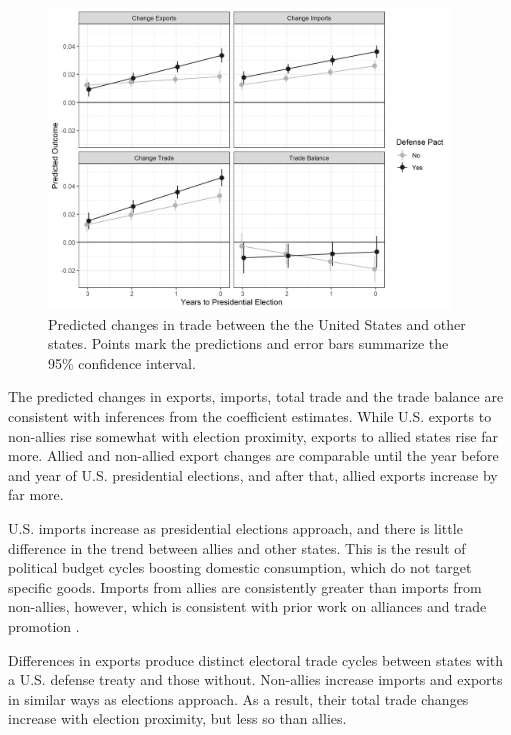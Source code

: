 \documentclass[12pt]{article}
\begin{document}
\begin{figure}[htpb]
	\centering
		\includegraphics[width=0.95\textwidth]{../figures/us-elec-pred.png}
	\caption{Predicted changes in trade between the the United States and other states. Points mark the predictions and error bars summarize the 95\% confidence interval.}
	\label{fig:us-elec-pred}
\end{figure}


The predicted changes in exports, imports, total trade and the trade balance are consistent with inferences from the coefficient estimates. 
While U.S. exports to non-allies rise somewhat with election proximity, exports to allied states rise far more. 
Allied and non-allied export changes are comparable until the year before and year of U.S. presidential elections, and after that, allied exports increase by far more. 


U.S. imports increase as presidential elections approach, and there is little difference in the trend between allies and other states. 
This is the result of political budget cycles boosting domestic consumption, which do not target specific goods.
Imports from allies are consistently greater than imports from non-allies, however, which is consistent with prior work on alliances and trade promotion \citep{GowaMansfield2004}. 


Differences in exports produce distinct electoral trade cycles between states with a U.S. defense treaty and those without. 
Non-allies increase imports and exports in similar ways as elections approach. 
As a result, their total trade changes increase with election proximity, but less so than allies. 
\end{document}
